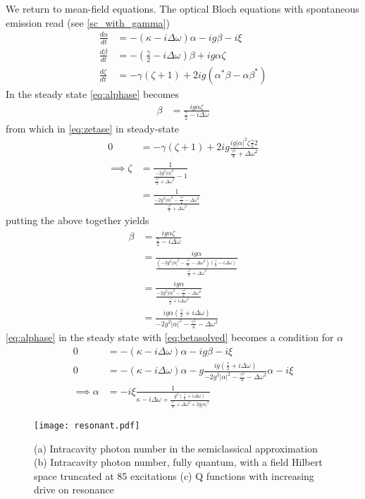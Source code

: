 We return to mean-field equations. The optical Bloch equations with spontaneous emission read (see \cref{sc_with_gamma})
\begin{align}
  \frac{d \alpha}{dt} &= -(\kappa - i \Delta \omega)\alpha - ig \beta - i\xi\label{eq:alphase}\\
  \frac{d \beta}{dt} &= -(\frac{\gamma}{2}-i\Delta\omega)\beta+ig\alpha\zeta \label{eq:betase}\\
  \frac{d\zeta}{dt} &= -\gamma (\zeta +1)+2ig(\alpha^*\beta-\alpha\beta^*) \label{eq:zetase}
\end{align}
In the steady state \cref{eq:alphase} becomes
\begin{align}
  \beta &= \frac{ig\alpha\zeta}{\frac{\gamma}{2}-i\Delta\omega}
\end{align}
from which in \cref{eq:zetase} in steady-state
\begin{align}
  0 &= -\gamma(\zeta+1)+2ig\frac{ig|\alpha|^2\zeta\frac{\gamma}{2}2}{\frac{\gamma^2}{4}+\Delta\omega^2} \\
  \implies \zeta &= \frac{1}{\frac{-2g^2|\alpha|^2}{\frac{\gamma^2}{4} +\Delta\omega^2}-1} \\
  &= \frac{1}{\frac{-2g^2|\alpha|^2 - \frac{\gamma^2}{4}-\Delta\omega^2}{\frac{\gamma^2}{4} +\Delta\omega^2}}
\end{align}
putting the above together yields
\begin{align}
  \beta &= \frac{ig\alpha\zeta}{\frac{\gamma}{2}-i\Delta\omega}\\
  &= \frac{ig\alpha}{\frac{(-2g^2|\alpha|^2-\frac{\gamma^2}{4}-\Delta\omega^2)(\frac{\gamma}{2}-i\Delta\omega)}{\frac{\gamma^2}{4}+\Delta\omega^2}}\\
  &= \frac{ig\alpha}{\frac{-2g^2|\alpha|^2-\frac{\gamma^2}{4}-\Delta\omega^2}{\frac{\gamma}{2}+i\Delta\omega^2}}\\
  &= \frac{ig\alpha(\frac{\gamma}{2}+i\Delta\omega)}{-2g^2|\alpha|^2-\frac{\gamma^2}{4}-\Delta\omega^2} \label{eq:betasolved}
\end{align}
\cref{eq:alphase} in the steady state with  \cref{eq:betasolved} becomes a condition for $\alpha$
\begin{align} %
  0&=-(\kappa-i\Delta\omega)\alpha-ig\beta-i\xi \\
  0&=-{(\kappa-i\Delta\omega)}\alpha-g\frac{ig(\frac{\gamma}{2}+i\Delta\omega)}{-2g^2|\alpha|^2-\frac{\gamma^2}{4}-\Delta\omega^2}\alpha-i\xi \\
\implies \alpha &= -i\xi \frac{1}{\kappa-i\Delta\omega+\frac{g^2(\frac{\gamma}{2}+i\Delta\omega)}{\frac{\gamma^2}{4}+{\Delta\omega}^2+2g{|\alpha|}^2}}\label{eq:alphadetdiss}
\end{align}
\begin{figure*}[ht]
    \texttt{[image: resonant.pdf]}
    \caption{(a) Intracavity photon number in the semiclassical approximation (b) Intracavity photon number, fully quantum, with a field Hilbert space truncated at 85 excitations (c) Q functions with increasing drive on resonance}
    \label{resonant}
\end{figure*}

